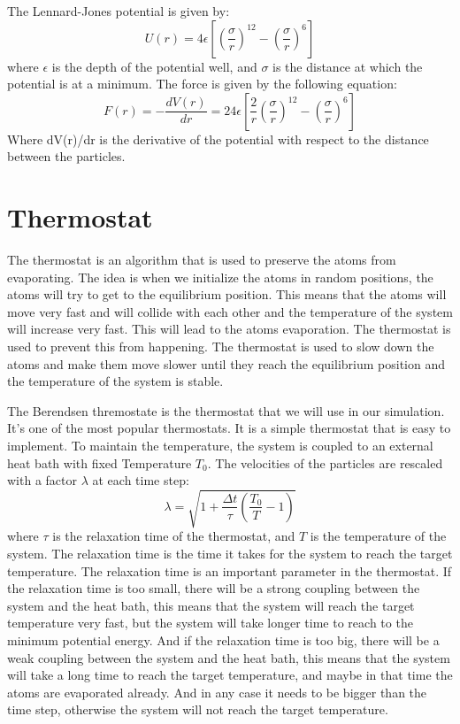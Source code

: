     The Lennard-Jones potential is given by:
    \begin{equation}
        U(r) = 4\epsilon\left[\left(\frac{\sigma}{r}\right)^{12}-\left(\frac{\sigma}{r}\right)^6\right]
    \end{equation}
    where $\epsilon$ is the depth of the potential well, and $\sigma$ is the distance at which the potential is at a minimum.
    The force is given by the following equation:
    \begin{equation}
        F(r) = -\frac{dV(r)}{dr} = 24\epsilon\left[\frac{2}{r}\left(\frac{\sigma}{r}\right)^{12}-\left(\frac{\sigma}{r}\right)^6\right]
    \end{equation}
    Where dV(r)/dr is the derivative of the potential with respect to the distance between the particles.


\section{Thermostat}
    The thermostat is an algorithm that is used to preserve the atoms from evaporating. The idea is when we initialize the atoms in random positions, the atoms will try to get to the equilibrium position. This means that the atoms will move very fast and will collide with each other and the temperature of the system will increase very fast. This will lead to the atoms evaporation. The thermostat is used to prevent this from happening. The thermostat is used to slow down the atoms and make them move slower until they reach the equilibrium position and the temperature of the system is stable. 
    
    The Berendsen thremostate is the thermostat that we will use in our simulation. It's one of the most popular thermostats. It is a simple thermostat that is easy to implement. To maintain the temperature, the system is coupled to an external heat bath with fixed Temperature $T_{0}$\cite{berendsen1984molecular}. The
    velocities of the particles are rescaled with a factor $\lambda$ at each time step:
    \begin{equation}
        \lambda = \sqrt{1+\frac{\Delta t}{\tau}\left(\frac{T_{0}}{T}-1\right)}
    \end{equation}
    where $\tau$ is the relaxation time of the thermostat, and $T$ is the temperature of the system. The relaxation time is the time it takes for the system to reach the target temperature. The relaxation time is an important parameter in the thermostat. If the relaxation time is too small, there will be a strong coupling between the system and the heat bath, this means that the system will reach the target temperature very fast, but the system will take longer time to reach to the minimum potential energy. And if the relaxation time is too big, there will be a weak coupling between the system and the heat bath, this means that the system will take a long time to reach the target temperature, and maybe in that time the atoms are evaporated already.
    And in any case it needs to be bigger than the time step, otherwise the system will not reach the target temperature.


